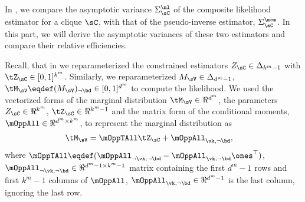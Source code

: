 \subsection{}
\label{app:pw-proof}

In , we compare the asymptotic variance
  $\Sigma^\ml_\sC$ of the composite likelihood estimator for a clique
  $\sC$, with that of the pseudo-inverse estimator, $\Sigma^\mom_\sC$. 
In this part, we will derive the asymptotic variances of these two
  estimators and compare their relative efficiencies.

Recall, that in  we reparameterized the
  constrained estimators $Z_\sC \in \Delta_{k^m-1}$ with $\tZ_\sC \in
  [0,1]^{k^m}$. 
Similarly, we reparameterized  $M_\sV \in \Delta_{d^m - 1}$,
  $\tM_\sV \eqdef (M_\sV)_{\neg \bd} \in [0,1]^{d^m}$ to compute
  the likelihood.
We used the vectorized forms of the marginal distribution $\tM_\sV \in
  \Re^{d^m}$, the parameters $Z_\sC \in \Re^{k^m}$, $\tZ_\sC \in
  \Re^{k^m-1}$ and the matrix form of the conditional moments, $\mOppAll
  \in \Re^{d^m \times k^m}$, to represent the marginal distribution as
\begin{align*}
  \tM_\sV &= \mOppTAll \tZ_\sC + \mOppAll_{\vk, \neg \bd},
\end{align*}
where $\mOppTAll \eqdef (\mOppAll_{\neg \vk, \neg \bd}
- \mOppAll_{\vk, \neg \bd}\ones^\top)$, $\mOppAll_{\neg \vk, \neg \bd} \in \Re^{d^m - 1 \times
k^m - 1}$ matrix containing the first $d^m-1$ rows and first $k^m-1$ columns of $\mOppAll$,
$\mOppAll_{\vk,\neg \bd} \in \Re^{d^m-1}$ is the last column, ignoring the last row.

